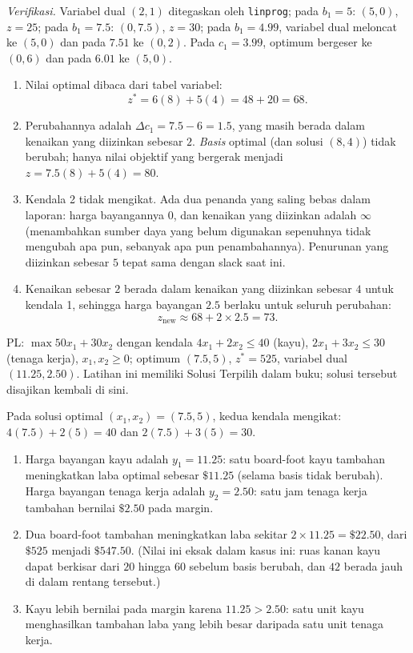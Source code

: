 \emph{Verifikasi.} Variabel dual $(2,1)$ ditegaskan oleh \texttt{linprog}; pada $b_1 = 5$: $(5,0)$, $z = 25$; pada $b_1 = 7.5$: $(0, 7.5)$, $z = 30$; pada $b_1 = 4.99$, variabel dual meloncat ke $(5,0)$ dan pada $7.51$ ke $(0,2)$. Pada $c_1 = 3.99$, optimum bergeser ke $(0,6)$ dan pada $6.01$ ke $(5,0)$.


\begin{enumerate}
\item Nilai optimal dibaca dari tabel variabel:
\[
z^* = 6(8) + 5(4) = 48 + 20 = 68 .
\]
\item Perubahannya adalah $\Delta c_1 = 7.5 - 6 = 1.5$, yang masih berada dalam kenaikan yang diizinkan sebesar $2$. \emph{Basis} optimal (dan solusi $(8,4)$) tidak berubah; hanya nilai objektif yang bergerak menjadi $z = 7.5(8) + 5(4) = 80$.
\item Kendala 2 tidak mengikat. Ada dua penanda yang saling bebas dalam laporan: harga bayangannya $0$, dan kenaikan yang diizinkan adalah $\infty$ (menambahkan sumber daya yang belum digunakan sepenuhnya tidak mengubah apa pun, sebanyak apa pun penambahannya). Penurunan yang diizinkan sebesar $5$ tepat sama dengan slack saat ini.
\item Kenaikan sebesar $2$ berada dalam kenaikan yang diizinkan sebesar $4$ untuk kendala 1, sehingga harga bayangan $2.5$ berlaku untuk seluruh perubahan:
\[
z_{\text{new}} \approx 68 + 2 \times 2.5 = 73 .
\]
\end{enumerate}


PL: $\max 50x_1 + 30x_2$ dengan kendala $4x_1 + 2x_2 \le 40$ (kayu), $2x_1 + 3x_2 \le 30$ (tenaga kerja), $x_1, x_2 \ge 0$; optimum $(7.5, 5)$, $z^* = 525$, variabel dual $(11.25, 2.50)$. Latihan ini memiliki Solusi Terpilih dalam buku; solusi tersebut disajikan kembali di sini.

Pada solusi optimal $(x_1, x_2) = (7.5, 5)$, kedua kendala mengikat: $4(7.5) + 2(5) = 40$ dan $2(7.5) + 3(5) = 30$.

\begin{enumerate}
\item Harga bayangan kayu adalah $y_1 = 11.25$: satu board-foot kayu tambahan meningkatkan laba optimal sebesar $\$11.25$ (selama basis tidak berubah). Harga bayangan tenaga kerja adalah $y_2 = 2.50$: satu jam tenaga kerja tambahan bernilai $\$2.50$ pada margin.
\item Dua board-foot tambahan meningkatkan laba sekitar $2 \times 11.25 = \$22.50$, dari $\$525$ menjadi $\$547.50$. (Nilai ini eksak dalam kasus ini: ruas kanan kayu dapat berkisar dari $20$ hingga $60$ sebelum basis berubah, dan $42$ berada jauh di dalam rentang tersebut.)
\item Kayu lebih bernilai pada margin karena $11.25 > 2.50$: satu unit kayu menghasilkan tambahan laba yang lebih besar daripada satu unit tenaga kerja.
\end{enumerate}

